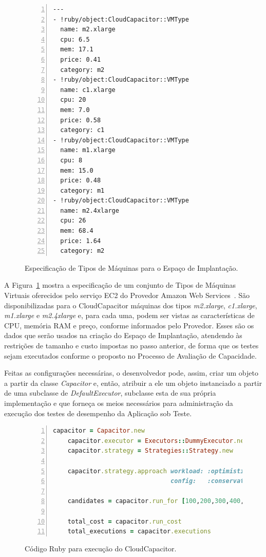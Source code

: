 \begin{figure}[t]
 \begin{lstlisting}[linewidth=\textwidth,xleftmargin=.04\textwidth, numbers=left]
---
- !ruby/object:CloudCapacitor::VMType
  name: m2.xlarge
  cpu: 6.5
  mem: 17.1
  price: 0.41
  category: m2
- !ruby/object:CloudCapacitor::VMType
  name: c1.xlarge
  cpu: 20
  mem: 7.0
  price: 0.58
  category: c1
- !ruby/object:CloudCapacitor::VMType
  name: m1.xlarge
  cpu: 8
  mem: 15.0
  price: 0.48
  category: m1
- !ruby/object:CloudCapacitor::VMType
  name: m2.4xlarge
  cpu: 26
  mem: 68.4
  price: 1.64
  category: m2
  \end{lstlisting}
  \caption{\label{fig:depspace}Especificação de Tipos de Máquinas para o Espaço de Implantação.}
\end{figure}

A Figura~\ref{fig:depspace} mostra a especificação de um conjunto de Tipos de
Máquinas Virtuais oferecidos pelo serviço EC2 do Provedor Amazon Web 
Services~\cite{ec2}. São disponibilizadas para o CloudCapacitor máquinas 
dos tipos \emph{m2.xlarge}, \emph{c1.xlarge}, \emph{m1.xlarge} e \emph{m2.4xlarge} e, para
cada uma, podem ser vistas as características de CPU, memória RAM e preço, conforme
informados pelo Provedor. Esses são os dados que serão usados na criação do Espaço
de Implantação, atendendo às restrições de tamanho e custo impostas no passo 
anterior, de forma que os testes sejam executados conforme o proposto
no Processo de Avaliação de Capacidade.

Feitas as configurações necessárias, o desenvolvedor pode, assim, criar um objeto 
a partir da classe \emph{Capacitor} e, então, atribuir a ele um objeto instanciado
a partir de uma subclasse de \emph{DefaultExecutor}, subclasse esta de sua própria
implementação e que forneça os meios necessários para administração da execução
dos testes de desempenho da Aplicação sob Teste.

\begin{figure}[t]
 \begin{lstlisting}[language=Ruby,linewidth=\textwidth,xleftmargin=.04\textwidth, numbers=left]
    capacitor = Capacitor.new
    capacitor.executor = Executors::DummyExecutor.new
    capacitor.strategy = Strategies::Strategy.new

    capacitor.strategy.approach workload: :optimistic,
                                config:   :conservative

    candidates = capacitor.run_for [100,200,300,400,500]
    
    total_cost = capacitor.run_cost
    total_executions = capacitor.executions  
 \end{lstlisting}
  \caption{\label{fig:mincode}Código Ruby para execução do CloudCapacitor.}
\end{figure}

